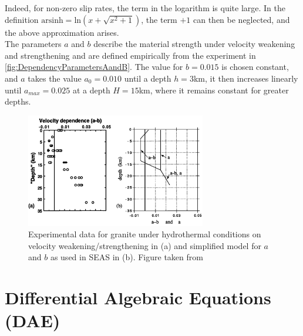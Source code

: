 Indeed, for non-zero slip rates, the term in the logarithm is quite large. In the definition $\text{arsinh} = \text{ln}\left(x + \sqrt{x^2+1}\right)$, the term $+1$ can then be neglected, and the above approximation arises. \\

The parameters $a$ and $b$ describe the material strength under velocity weakening and strengthening and are defined empirically from the experiment in \autoref{fig:DependencyParametersAandB}. The value for $b=0.015$ is chosen constant, and $a$ takes the value $a_0=0.010$ until a depth $h=3$km, it then increases linearly until $a_{max}=0.025$ at a depth $H=15$km, where it remains constant for greater depths. 

\begin{figure}[H]
	\centering
	\includegraphics[width=0.7\textwidth]{images/ParametersAandBExperimental.png}
	\caption{Experimental data for granite under hydrothermal conditions on velocity weakening/strengthening in (a) and simplified model for $a$ and $b$ as used in SEAS in (b). Figure taken from \cite{GeneralSEASSimulations}}
	\label{fig:DependencyParametersAandB}
\end{figure}




\section{Differential Algebraic Equations (DAE)}
\label{sec:Theory_DAE}

